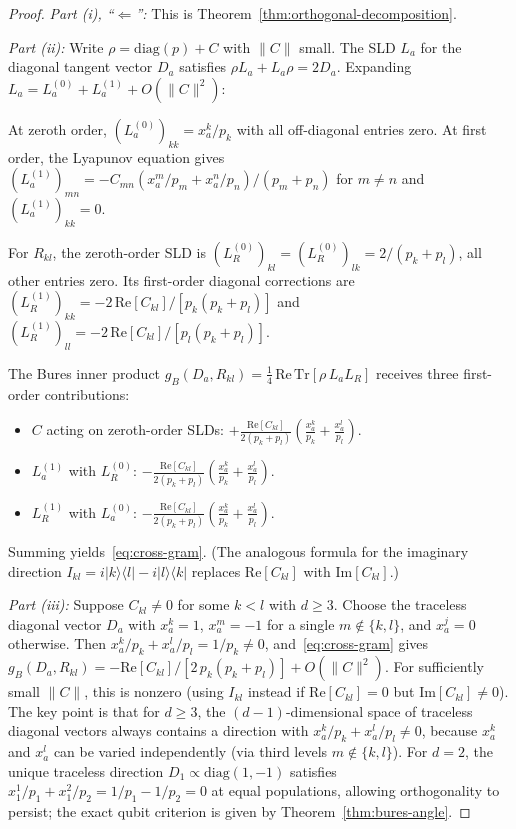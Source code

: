 \documentclass[12pt,a4paper]{article}
\theoremstyle{definition}
\theoremstyle{remark}
\begin{document}
\begin{proof}
\emph{Part (i), ``$\Leftarrow$'':} This is Theorem~\ref{thm:orthogonal-decomposition}.

\emph{Part (ii):}  Write $\rho = \mathrm{diag}(p) + C$ with $\lVert C \rVert$ small.  The SLD $L_a$ for the diagonal tangent vector $D_a$ satisfies $\rho L_a + L_a \rho = 2 D_a$.  Expanding $L_a = L_a^{(0)} + L_a^{(1)} + O(\lVert C \rVert^2)$:

At zeroth order, $(L_a^{(0)})_{kk} = x_a^k / p_k$ with all off-diagonal entries zero.  At first order, the Lyapunov equation gives $(L_a^{(1)})_{mn} = -C_{mn}(x_a^m/p_m + x_a^n/p_n)/(p_m + p_n)$ for $m \neq n$ and $(L_a^{(1)})_{kk} = 0$.

For $R_{kl}$, the zeroth-order SLD is $(L_R^{(0)})_{kl} = (L_R^{(0)})_{lk} = 2/(p_k + p_l)$, all other entries zero.  Its first-order diagonal corrections are $(L_R^{(1)})_{kk} = -2\,\mathrm{Re}[C_{kl}]/[p_k(p_k + p_l)]$ and $(L_R^{(1)})_{ll} = -2\,\mathrm{Re}[C_{kl}]/[p_l(p_k + p_l)]$.

The Bures inner product $g_B(D_a, R_{kl}) = \frac{1}{4}\,\mathrm{Re}\,\mathrm{Tr}[\rho\, L_a L_R]$ receives three first-order contributions:
\begin{itemize}
\item $C$ acting on zeroth-order SLDs: $+\frac{\mathrm{Re}[C_{kl}]}{2(p_k+p_l)}\!\left(\frac{x_a^k}{p_k} + \frac{x_a^l}{p_l}\right)$.
\item $L_a^{(1)}$ with $L_R^{(0)}$: $-\frac{\mathrm{Re}[C_{kl}]}{2(p_k+p_l)}\!\left(\frac{x_a^k}{p_k} + \frac{x_a^l}{p_l}\right)$.
\item $L_R^{(1)}$ with $L_a^{(0)}$: $-\frac{\mathrm{Re}[C_{kl}]}{2(p_k+p_l)}\!\left(\frac{x_a^k}{p_k} + \frac{x_a^l}{p_l}\right)$.
\end{itemize}
Summing yields~\eqref{eq:cross-gram}.  (The analogous formula for the imaginary direction $I_{kl} = i|k\rangle\langle l| - i|l\rangle\langle k|$ replaces $\mathrm{Re}[C_{kl}]$ with $\mathrm{Im}[C_{kl}]$.)

\emph{Part (iii):}  Suppose $C_{kl} \neq 0$ for some $k < l$ with $d \geq 3$.  Choose the traceless diagonal vector $D_a$ with $x_a^k = 1$, $x_a^m = -1$ for a single $m \notin \{k, l\}$, and $x_a^j = 0$ otherwise.  Then $x_a^k/p_k + x_a^l/p_l = 1/p_k \neq 0$, and~\eqref{eq:cross-gram} gives $g_B(D_a, R_{kl}) = -\mathrm{Re}[C_{kl}]/[2\,p_k(p_k + p_l)] + O(\lVert C \rVert^2)$.  For sufficiently small $\lVert C \rVert$, this is nonzero (using $I_{kl}$ instead if $\mathrm{Re}[C_{kl}] = 0$ but $\mathrm{Im}[C_{kl}] \neq 0$).  The key point is that for $d \geq 3$, the $(d-1)$-dimensional space of traceless diagonal vectors always contains a direction with $x_a^k/p_k + x_a^l/p_l \neq 0$, because $x_a^k$ and $x_a^l$ can be varied independently (via third levels $m \notin \{k,l\}$).  For $d = 2$, the unique traceless direction $D_1 \propto \mathrm{diag}(1,-1)$ satisfies $x_1^1/p_1 + x_1^2/p_2 = 1/p_1 - 1/p_2 = 0$ at equal populations, allowing orthogonality to persist; the exact qubit criterion is given by Theorem~\ref{thm:bures-angle}.


\end{proof}
\end{document}
